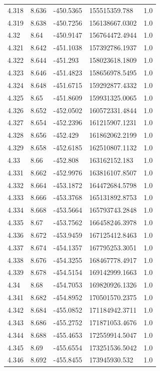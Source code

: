 \begin{tabular}{lllll}
4.318 & 8.636 & -450.5365 & 155515359.788 & 1.0 \\
4.319 & 8.638 & -450.7256 & 156138667.0302 & 1.0 \\
4.32 & 8.64 & -450.9147 & 156764472.4944 & 1.0 \\
4.321 & 8.642 & -451.1038 & 157392786.1937 & 1.0 \\
4.322 & 8.644 & -451.293 & 158023618.1809 & 1.0 \\
4.323 & 8.646 & -451.4823 & 158656978.5495 & 1.0 \\
4.324 & 8.648 & -451.6715 & 159292877.4332 & 1.0 \\
4.325 & 8.65 & -451.8609 & 159931325.0065 & 1.0 \\
4.326 & 8.652 & -452.0502 & 160572331.4844 & 1.0 \\
4.327 & 8.654 & -452.2396 & 161215907.1231 & 1.0 \\
4.328 & 8.656 & -452.429 & 161862062.2199 & 1.0 \\
4.329 & 8.658 & -452.6185 & 162510807.1132 & 1.0 \\
4.33 & 8.66 & -452.808 & 163162152.183 & 1.0 \\
4.331 & 8.662 & -452.9976 & 163816107.8507 & 1.0 \\
4.332 & 8.664 & -453.1872 & 164472684.5798 & 1.0 \\
4.333 & 8.666 & -453.3768 & 165131892.8753 & 1.0 \\
4.334 & 8.668 & -453.5664 & 165793743.2848 & 1.0 \\
4.335 & 8.67 & -453.7562 & 166458246.3978 & 1.0 \\
4.336 & 8.672 & -453.9459 & 167125412.8463 & 1.0 \\
4.337 & 8.674 & -454.1357 & 167795253.3051 & 1.0 \\
4.338 & 8.676 & -454.3255 & 168467778.4917 & 1.0 \\
4.339 & 8.678 & -454.5154 & 169142999.1663 & 1.0 \\
4.34 & 8.68 & -454.7053 & 169820926.1326 & 1.0 \\
4.341 & 8.682 & -454.8952 & 170501570.2375 & 1.0 \\
4.342 & 8.684 & -455.0852 & 171184942.3711 & 1.0 \\
4.343 & 8.686 & -455.2752 & 171871053.4676 & 1.0 \\
4.344 & 8.688 & -455.4653 & 172559914.5047 & 1.0 \\
4.345 & 8.69 & -455.6554 & 173251536.5042 & 1.0 \\
4.346 & 8.692 & -455.8455 & 173945930.532 & 1.0 \\

\end{tabular}

